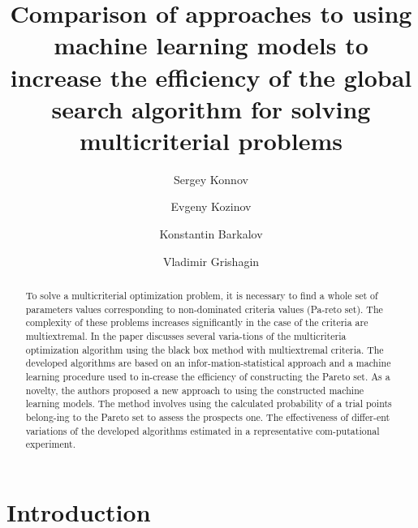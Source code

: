 \documentclass[runningheads]{llncs}
\begin{document}
%
\title{Comparison of approaches to using machine learning models to increase the efficiency of the global search algorithm for solving multicriterial problems}
%
%
\author{Sergey Konnov \and
Evgeny Kozinov \Letter{} \and
Konstantin Barkalov \Letter{} \and
Vladimir Grishagin}
%

%
\maketitle

%
\begin{abstract}
To solve a multicriterial optimization problem, it is necessary to find a whole set of parameters values corresponding to non-dominated criteria values (Pa-reto set). The complexity of these problems increases significantly in the case of the criteria are multiextremal. In the paper discusses several varia-tions of the multicriteria optimization algorithm using the black box method with multiextremal criteria. The developed algorithms are based on an infor-mation-statistical approach and a machine learning procedure used to in-crease the efficiency of constructing the Pareto set. As a novelty, the authors proposed a new approach to using the constructed machine learning models. The method involves using the calculated probability of a trial points belong-ing to the Pareto set to assess the prospects one. The effectiveness of differ-ent variations of the developed algorithms estimated in a representative com-putational experiment.

\end{abstract}
%
%
%
\section{Introduction}
\label{sec:1}
\end{document}
